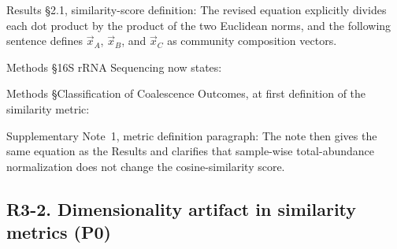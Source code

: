 Results \S2.1, similarity-score definition:  The revised equation explicitly divides each dot product by the product of the two Euclidean norms, and the following sentence defines $\vec{x}_A$, $\vec{x}_B$, and $\vec{x}_C$ as community composition vectors.

Methods \S 16S rRNA Sequencing now states: 

Methods \S Classification of Coalescence Outcomes, at first definition of the similarity metric: 

Supplementary Note~1, metric definition paragraph:  The note then gives the same equation as the Results and clarifies that sample-wise total-abundance normalization does not change the cosine-similarity score.

\subsection*{R3-2. Dimensionality artifact in similarity metrics (P0)}

